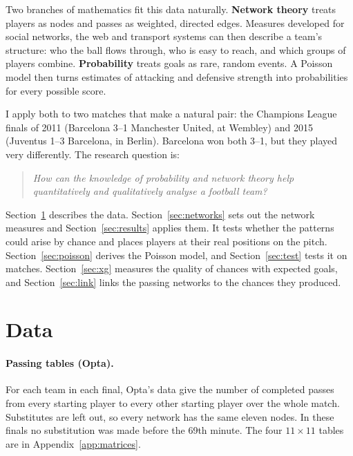 \documentclass[11pt,a4paper]{article}
\begin{document}
Two branches of mathematics fit this data naturally. \textbf{Network theory} treats players as nodes and passes as weighted, directed edges. Measures developed for social networks, the web and transport systems can then describe a team's structure: who the ball flows through, who is easy to reach, and which groups of players combine. \textbf{Probability} treats goals as rare, random events. A Poisson model then turns estimates of attacking and defensive strength into probabilities for every possible score.

I apply both to two matches that make a natural pair: the Champions League finals of 2011 (Barcelona 3--1 Manchester United, at Wembley) and 2015 (Juventus 1--3 Barcelona, in Berlin). Barcelona won both 3--1, but they played very differently. The research question is:

\begin{quote}
\emph{How can the knowledge of probability and network theory help quantitatively and qualitatively analyse a football team?}
\end{quote}

\noindent Section~\ref{sec:data} describes the data. Section~\ref{sec:networks} sets out the network measures and Section~\ref{sec:results} applies them. It tests whether the patterns could arise by chance and places players at their real positions on the pitch. Section~\ref{sec:poisson} derives the Poisson model, and Section~\ref{sec:test} tests it on \nKO{} matches. Section~\ref{sec:xg} measures the quality of chances with expected goals, and Section~\ref{sec:link} links the passing networks to the chances they produced.

\section{Data}\label{sec:data}

\paragraph{Passing tables (Opta).} For each team in each final, Opta's data give the number of completed passes from every starting player to every other starting player over the whole match. Substitutes are left out, so every network has the same eleven nodes. In these finals no substitution was made before the 69th minute. The four $11\times 11$ tables are in Appendix~\ref{app:matrices}.
\end{document}
